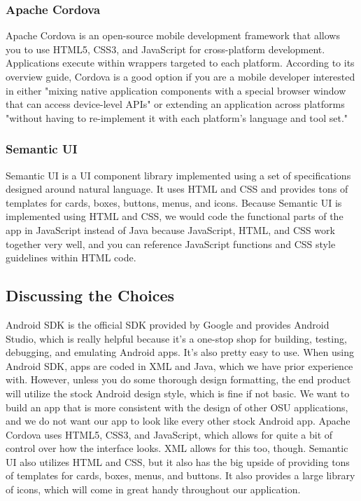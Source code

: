 \documentclass[draftclsnofoot, onecolumn, 10pt, compsoc]{IEEEtran}
\begin{document}
			\subsubsection{\textbf{Apache Cordova}}
				Apache Cordova is an open-source mobile development framework that allows you to use HTML5, CSS3, and JavaScript for cross-platform development. Applications execute within wrappers targeted to each platform. According to its overview guide, Cordova is a good option if you are a mobile developer interested in either "mixing native application components with a special browser window that can access device-level APIs" or extending an application across platforms "without having to re-implement it with each platform's language and tool set."
				~\cite{Apache_Cordova}		
			\subsubsection{\textbf{Semantic UI}}
				Semantic UI is a UI component library implemented using a set of specifications designed around natural language. It uses HTML and CSS and provides tons of templates for cards, boxes, buttons, menus, and icons. Because Semantic UI is implemented using HTML and CSS, we would code the functional parts of the app in JavaScript instead of Java because JavaScript, HTML, and CSS work together very well, and you can reference JavaScript functions and CSS style guidelines within HTML code.
				~\cite{Semantic_UI}
		
		\subsection{Discussing the Choices}
			Android SDK is the official SDK provided by Google and provides Android Studio, which is really helpful because it's a one-stop shop for building, testing, debugging, and emulating Android apps. It's also pretty easy to use. When using Android SDK, apps are coded in XML and Java, which we have prior experience with. However, unless you do some thorough design formatting, the end product will utilize the stock Android design style, which is fine if not basic. We want to build an app that is more consistent with the design of other OSU applications, and we do not want our app to look like every other stock Android app. Apache Cordova uses HTML5, CSS3, and JavaScript, which allows for quite a bit of control over how the interface looks. XML allows for this too, though. Semantic UI also utilizes HTML and CSS, but it also has the big upside of providing tons of templates for cards, boxes, menus, and buttons. It also provides a large library of icons, which will come in great handy throughout our application.
		
\end{document}
